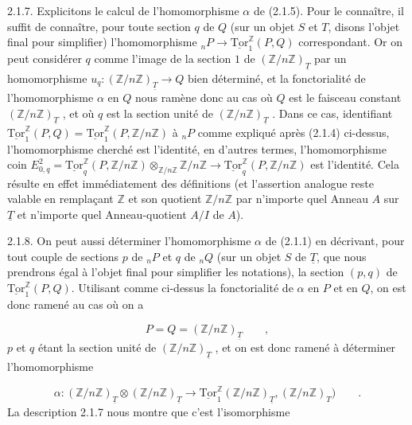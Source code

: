 2.1.7. Explicitons le calcul de l'homomorphisme $\alpha$ de (2.1.5). Pour le connaître, il suffit de connaître, pour toute section $q$ de $Q$ (sur un objet $S$ et $T$, disons l'objet final pour simplifier) l'homomorphisme ${}_nP \longrightarrow \underline{\mathrm{Tor}}_1^{\mathbb{Z}}(P,Q)$ correspondant. Or on peut considérer $q$ comme l'image de la section $1$ de $(\mathbb{Z}/n\mathbb{Z})_{\underline{T}}$ par un homomorphisme $u_q : (\mathbb{Z}/n\mathbb{Z})_{\underline{T}} \longrightarrow Q$ bien déterminé, et la fonctorialité de l'homomorphisme $\alpha$ en $Q$ nous
ramène donc au cas où $Q$ est le faisceau constant $(\mathbb{Z}/n\mathbb{Z})_{\underline{T}}$ , et où $q$ est la section unité de $(\mathbb{Z}/n\mathbb{Z})_{\underline{T}}$ . Dans ce cas, identifiant $\underline{\mathrm{Tor}}_1^{\mathbb{Z}}(P,Q) = \underline{\mathrm{Tor}}_1^{\mathbb{Z}}(P,\mathbb{Z}/n\mathbb{Z})$ à ${}_nP$ comme expliqué après (2.1.4) ci-dessus, l'homomorphisme cherché est l'identité, en d'autres termes, l'homomorphisme coin $E^2_{0,q} = \underline{\mathrm{Tor}}_q^{\mathbb{Z}}(P,\mathbb{Z}/n\mathbb{Z}) \otimes_{\mathbb{Z}/n\mathbb{Z}} \mathbb{Z}/n\mathbb{Z} \longrightarrow \underline{\mathrm{Tor}}_q^{\mathbb{Z}}(P,\mathbb{Z}/n\mathbb{Z})$ est l'identité. Cela résulte en effet immédiatement des définitions (et l'assertion analogue reste valable en remplaçant $\mathbb{Z}$ et son quotient $\mathbb{Z}/n\mathbb{Z}$ par n'importe quel Anneau $A$ sur $\underline{T}$ et n'importe quel Anneau-quotient $A/I$ de $A$).

2.1.8. On peut aussi déterminer l'homomorphisme $\alpha$ de (2.1.1) en décrivant, pour tout couple de sections $p$ de ${}_nP$ et $q$ de ${}_nQ$ (sur un objet $S$ de $\underline{T}$, que nous prendrons égal à l'objet final pour simplifier les notations), la section $(p,q)$ de $\underline{\mathrm{Tor}}_1^{\mathbb{Z}}(P,Q)$. Utilisant comme ci-dessus la fonctorialité de $\alpha$ en $P$ et en $Q$, on est donc ramené au cas où on a

\begin{equation*}
P = Q = (\mathbb{Z}/n\mathbb{Z})_{\underline{T}} \qquad ,
\end{equation*}
$p$ et $q$ étant la section unité de $(\mathbb{Z}/n\mathbb{Z})_{\underline{T}}$ , et on est donc ramené à déterminer l'homomorphisme

\begin{equation*}
\alpha : (\mathbb{Z}/n\mathbb{Z})_{\underline{T}} \otimes (\mathbb{Z}/n\mathbb{Z})_{\underline{T}} \longrightarrow \underline{\mathrm{Tor}}_1^{\mathbb{Z}} (\mathbb{Z}/n\mathbb{Z})_{\underline{T}} , (\mathbb{Z}/n\mathbb{Z})_T) \qquad .
\end{equation*}
La description 2.1.7 nous montre que c'est l'isomorphisme

